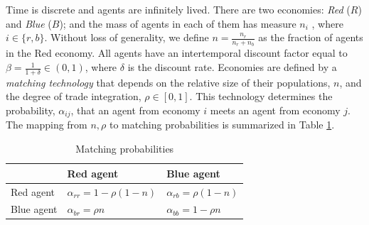 Time is discrete and agents are infinitely lived. There are two economies: \textit{Red} ($R$) and \textit{Blue} ($B$); and the mass of agents in each of them has measure $n_i$ , where $i \in \lbrace{ r,b \rbrace}$. Without loss of generality, we define $n=\frac{n_r}{n_r+n_b}$ as the fraction of agents in the Red economy.
All agents have an intertemporal discount factor equal to $\beta = \frac{1}{1+\delta} \in (0,1)$, where $\delta$ is the discount rate. 
Economies are defined by a \textit{matching technology} that depends on the relative size of their populations, $n$, and the degree of trade integration, $\rho \in \left[0,1\right]$. This technology determines the probability, $\alpha_{ij}$, that an agent from economy $i$ meets an agent from economy $j$. The mapping from $n,\rho$ to matching probabilities is summarized in Table \ref{Table1}.

\begin{table}[ht]
\caption{Matching probabilities}
\centering
\begin{tabular}{lll}
\hline
            & Red agent                     & Blue agent \\ \hline
Red agent   & $\alpha_{rr} = 1-\rho(1-n)$   & $\alpha_{rb} = \rho(1-n)$  \\
Blue agent  & $\alpha_{br} = \rho n$        & $\alpha_{bb} = 1-\rho n$   \\ \hline
\end{tabular}
\label{Table1}
\end{table}



%                    

